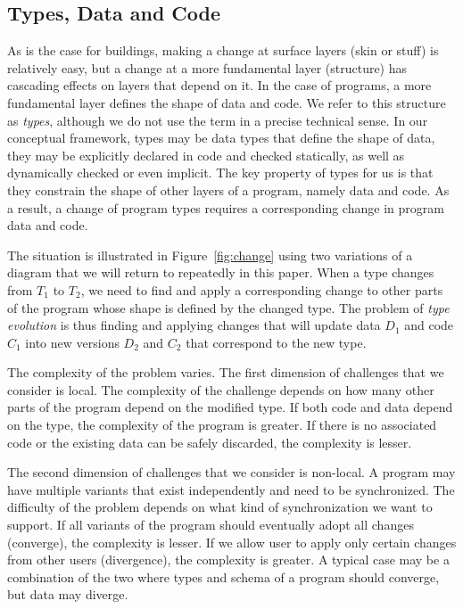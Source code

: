 \documentclass[english,submission]{programming}
\begin{document}
\subsection{Types, Data and Code}

As is the case for buildings, making a change at surface layers (skin or stuff) is relatively easy,
but a change at a more fundamental layer (structure) has cascading effects on layers that depend on it.
In the case of programs, a more fundamental layer defines the shape of data and code.
We refer to this structure as \emph{types}, although we do not use the term in a precise technical
sense. In our conceptual framework, types may be data types that define the shape of data, they
may be explicitly declared in code and checked statically, as well as dynamically checked or
even implicit. The key property of types for us is that they constrain the shape of other layers
of a program, namely data and code. As a result, a change of program types requires a
corresponding change in program data and code.

The situation is illustrated in Figure~\ref{fig:change} using two variations of a diagram that
we will return to repeatedly in this paper. When a type changes from $T_1$ to $T_2$,
we need to find and apply a corresponding change to other parts of the program whose shape
is defined by the changed type. The problem of \emph{type evolution} is thus finding and
applying changes that will update data $D_1$ and code $C_1$ into new versions $D_2$ and $C_2$
that correspond to the new type.

The complexity of the problem varies. The first dimension of challenges that we consider
is local. The complexity of the challenge depends on how many other parts of the program
depend on the modified type. If both code and data depend on the type, the complexity of the
program is greater. If there is no associated code or the existing data can be safely discarded,
the complexity is lesser.

The second dimension of challenges that we consider is non-local. A program may have multiple
variants that exist independently and need to be synchronized. The difficulty of the problem
depends on what kind of synchronization we want to support. If all variants of the program should
eventually adopt all changes (converge), the complexity is lesser. If we allow user to apply
only certain changes from other users (divergence), the complexity is greater. A typical case
may be a combination of the two where types and schema of a program should converge, but data
may diverge.
\end{document}
